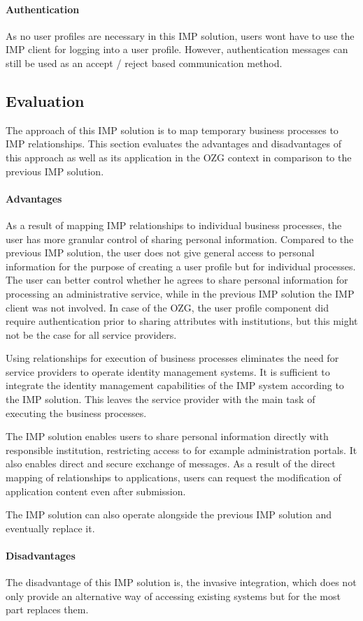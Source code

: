 \paragraph{Authentication}

As no user profiles are necessary in this IMP solution, users wont have to use the IMP client for logging into a user profile. However, authentication messages can still be used as an accept / reject based communication method.

\subsection{Evaluation}
The approach of this IMP solution is to map temporary business processes to IMP relationships. This section evaluates the advantages and disadvantages of this approach as well as its application in the OZG context in comparison to the previous IMP solution.

\paragraph{Advantages}

As a result of mapping IMP relationships to individual business processes, the user has more granular control of sharing personal information. Compared to the previous IMP solution, the user does not give general access to personal information for the purpose of creating a user profile but for individual processes. The user can better control whether he agrees to share personal information for processing an administrative service, while in the previous IMP solution the IMP client was not involved. In case of the OZG, the user profile component did require authentication prior to sharing attributes with institutions, but this might not be the case for all service providers.

Using relationships for execution of business processes eliminates the need for service providers to operate identity management systems. It is sufficient to integrate the identity management capabilities of the IMP system according to the IMP solution. This leaves the service provider with the main task of executing the business processes. 

The IMP solution enables users to share personal information directly with responsible institution, restricting access to for example administration portals. It also enables direct and secure exchange of messages.
As a result of the direct mapping of relationships to applications, users can request the modification of application content even after submission.

The IMP solution can also operate alongside the previous IMP solution and eventually replace it.

\paragraph{Disadvantages}

The disadvantage of this IMP solution is, the invasive integration, which does not only provide an alternative way of accessing existing systems but for the most part replaces them.